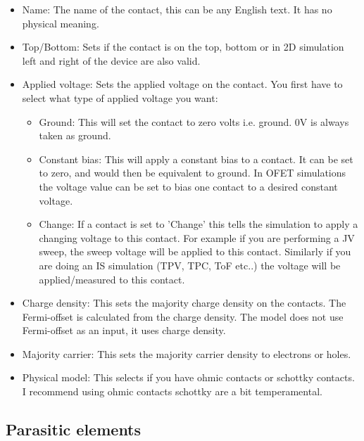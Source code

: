 \begin{itemize}
  \item Name: The name of the contact, this can be any English text. It has no physical meaning.
  \item Top/Bottom: Sets if the contact is on the top, bottom or in 2D simulation left and right of the device are also valid.
  \item Applied voltage: Sets the applied voltage on the contact. You first have to select what type of applied voltage you want:
		\begin{itemize}
		\item Ground: This will set the contact to zero volts i.e. ground. 0V is always taken as ground.
		\item Constant bias: This will apply a constant bias to a contact.  It can be set to zero, and would then be equivalent to ground.  In OFET simulations the voltage value can be set to bias one contact to a desired constant voltage.
		\item Change: If a contact is set to 'Change' this tells the simulation to apply a changing voltage to this contact. For example if you are performing a JV sweep, the sweep voltage will be applied to this contact.  Similarly if you are doing an IS simulation (TPV, TPC, ToF etc..) the voltage will be applied/measured to this contact.
		\end{itemize}
  \item Charge density: This sets the majority charge density on the contacts. The Fermi-offset is calculated from the charge density. The model does not use Fermi-offset as an input, it uses charge density.
  \item Majority carrier: This sets the majority carrier density to electrons or holes.
  \item Physical model: This selects if you have ohmic contacts or schottky contacts. I recommend using ohmic contacts schottky are a bit temperamental.

\end{itemize}



\subsection{Parasitic elements}
\label{sec:parasitic}

